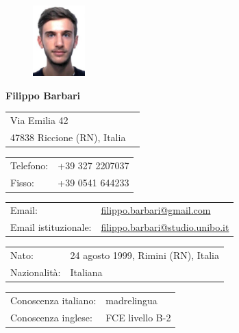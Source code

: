 \documentclass[curriculum-vitae-ita]{subfiles}
\begin{document}
	\begin{figure}
		\includegraphics[width=0.18\textwidth]{fototessera}
	\end{figure}
	
	{\LARGE\bfseries Filippo Barbari} %
	\bigskip
	
	\begin{tabular}{ll}
		Via Emilia 42 & \\
		47838 Riccione (RN), Italia & \\
	\end{tabular}
	\medskip
	
	\begin{tabular}{ll}
		Telefono: & +39 327 2207037\\
		Fisso: & +39 0541 644233
	\end{tabular}
	\medskip
	
	\begin{tabular}{ll}
		Email: & \href{mailto:filippo.barbari@gmail.com}{filippo.barbari@gmail.com}\\
		Email istituzionale: & \href{mailto:filippo.barbari@studio.unibo.it}{filippo.barbari@studio.unibo.it}
	\end{tabular}
	\medskip
	
	\begin{tabular}{ll}
		Nato: & 24 agosto 1999, Rimini (RN), Italia\\ %
		Nazionalità: & Italiana %
	\end{tabular}
	\medskip
	
	\begin{tabular}{ll}
		Conoscenza italiano: & madrelingua\\
		Conoscenza inglese: & FCE livello B-2
	\end{tabular}
\end{document}
